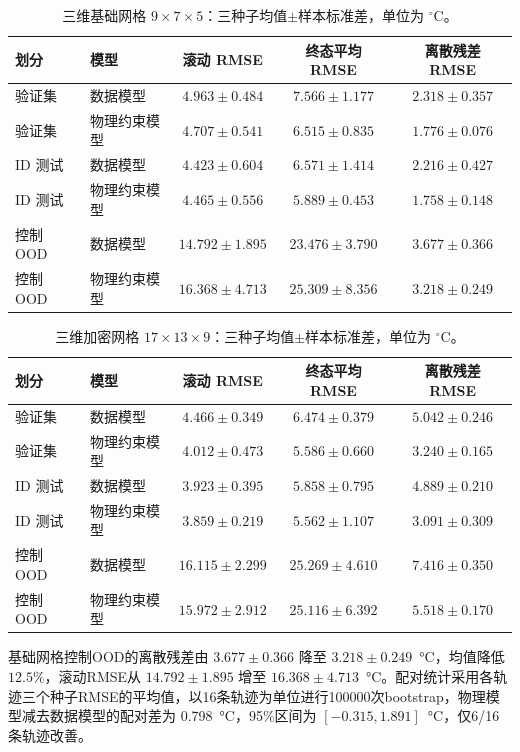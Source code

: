 \begin{table}[H]
\centering
\small
\setlength{\tabcolsep}{4pt}
\caption{三维基础网格 $9\times7\times5$：三种子均值$\pm$样本标准差，单位为 $^\circ\mathrm{C}$。}
\label{tab:three-dimensional-zoh-base}
\begin{tabular}{llccc}
\toprule
划分 & 模型 & 滚动 RMSE & 终态平均 RMSE & 离散残差 RMSE \\
\midrule
验证集 & 数据模型 & $4.963\pm0.484$ & $7.566\pm1.177$ & $2.318\pm0.357$ \\
验证集 & 物理约束模型 & $4.707\pm0.541$ & $6.515\pm0.835$ & $1.776\pm0.076$ \\
ID 测试 & 数据模型 & $4.423\pm0.604$ & $6.571\pm1.414$ & $2.216\pm0.427$ \\
ID 测试 & 物理约束模型 & $4.465\pm0.556$ & $5.889\pm0.453$ & $1.758\pm0.148$ \\
控制 OOD & 数据模型 & $14.792\pm1.895$ & $23.476\pm3.790$ & $3.677\pm0.366$ \\
控制 OOD & 物理约束模型 & $16.368\pm4.713$ & $25.309\pm8.356$ & $3.218\pm0.249$ \\
\bottomrule
\end{tabular}
\end{table}

\begin{table}[H]
\centering
\small
\setlength{\tabcolsep}{4pt}
\caption{三维加密网格 $17\times13\times9$：三种子均值$\pm$样本标准差，单位为 $^\circ\mathrm{C}$。}
\label{tab:three-dimensional-zoh-refined}
\begin{tabular}{llccc}
\toprule
划分 & 模型 & 滚动 RMSE & 终态平均 RMSE & 离散残差 RMSE \\
\midrule
验证集 & 数据模型 & $4.466\pm0.349$ & $6.474\pm0.379$ & $5.042\pm0.246$ \\
验证集 & 物理约束模型 & $4.012\pm0.473$ & $5.586\pm0.660$ & $3.240\pm0.165$ \\
ID 测试 & 数据模型 & $3.923\pm0.395$ & $5.858\pm0.795$ & $4.889\pm0.210$ \\
ID 测试 & 物理约束模型 & $3.859\pm0.219$ & $5.562\pm1.107$ & $3.091\pm0.309$ \\
控制 OOD & 数据模型 & $16.115\pm2.299$ & $25.269\pm4.610$ & $7.416\pm0.350$ \\
控制 OOD & 物理约束模型 & $15.972\pm2.912$ & $25.116\pm6.392$ & $5.518\pm0.170$ \\
\bottomrule
\end{tabular}
\end{table}

基础网格控制OOD的离散残差由 $3.677\pm0.366$ 降至 $3.218\pm0.249$~\si{\degreeCelsius}，均值降低 $12.5\%$，滚动RMSE从 $14.792\pm1.895$ 增至 $16.368\pm4.713$~\si{\degreeCelsius}。配对统计采用各轨迹三个种子RMSE的平均值，以16条轨迹为单位进行100000次bootstrap，物理模型减去数据模型的配对差为 \SI{0.798}{\degreeCelsius}，95\%区间为 $[-0.315,1.891]$~\si{\degreeCelsius}，仅6/16条轨迹改善。

